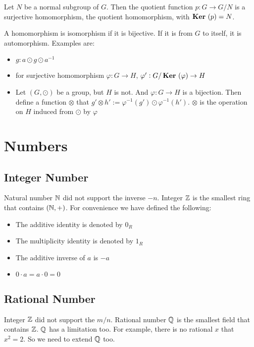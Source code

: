 \begin{theorem}
    Let $N$ be a normal subgroup of $G$. Then the quotient function $p: G \rightarrow G/N$ is a surjective homomorphism, the quotient homomorphism, with $\displaystyle \mathop{\bf Ker\/}~( p ) = N$.
\end{theorem}


\begin{definition}[isomorphism]
    A homomorphism is isomorphism if it is bijective. If it is from $G$ to itself, it is automorphism. Examples are:
    \begin{itemize}
        \item $g: a \odot g \odot a^{-1}$
        \item for surjective homomorphism $\varphi: G \rightarrow H$, $\varphi' : G/\displaystyle \mathop{\bf Ker\/}~( \varphi ) \rightarrow H$
        \item Let $(G, \odot)$ be a group, but $H$ is not. And $\varphi: G \rightarrow H$ is a bijection. Then define a function $\otimes$ that $g' \otimes h' := \varphi^{-1}(g') \odot \varphi^{-1}(h')$. $\otimes$ is the operation on $H$ induced from $\odot$ by $\varphi$
    \end{itemize}
\end{definition}



\section{Numbers}

\subsection{Integer Number}
Natural number $\mathbb{N}$ did not support the inverse $-n$. Integer $\mathbb{Z}$ is the smallest ring that contains $(\mathbb{N}, +)$. For convenience we have defined the following:
\begin{itemize}
    \item The additive identity is denoted by $0_R$
    \item The multiplicity identity is denoted by $1_R$
    \item The additive inverse of $a$ is $-a$
    \item $0 \cdot a = a \cdot 0 = 0$
\end{itemize}

\subsection{Rational Number}
Integer $\mathbb{Z}$ did not support the $m/n$. Rational number $\mathbb{Q}$ is the smallest field that contains $\mathbb{Z}$. $\mathbb{Q}$ has a limitation too. For example, there is no rational $x$ that $x^2 = 2$. So we need to extend $\mathbb{Q}$ too.

